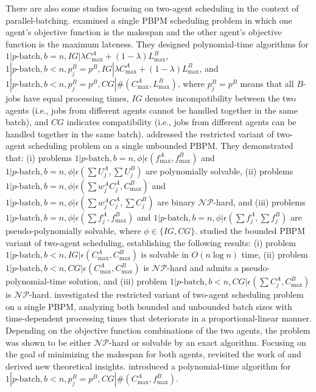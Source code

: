 \documentclass[12pt]{article}
\begin{document}
\begin{sloppypar}
There are also some studies focusing on two-agent scheduling in the context of parallel-batching. \cite{SabouniJolai2010AMM} examined a single PBPM scheduling problem in which one agent’s objective function is the makespan and the other agent's objective function is the maximum lateness.
They designed polynomial-time algorithms for $1 |p\text{-batch}, b = n, IG|\lambda C_{\max}^{A}+(1-\lambda)L_{\max}^{B}$, $1 |p\text{-batch}, b < n, p_j^B=p^B, IG|\lambda C_{\max}^{A}+(1-\lambda)L_{\max}^{B}$, and $1 |p\text{-batch}, b < n, p_j^B=p^B, CG|\#(C_{\max}^{A}, L_{\max}^{B}) $, where $p_j^B=p^B$ means that all $B$-jobs have equal processing times, $\mathit{IG}$ denotes incompatibility between the two agents (i.e., jobs from different agents cannot be handled together in the same batch), and $\mathit{CG}$ indicates compatibility (i.e., jobs from different agents can be handled together in the same batch). \cite{LiYuan2012JOS} addressed the restricted variant of two-agent scheduling problem on a single unbounded PBPM. They demonstrated that: (i) problems $1 |p\text{-batch}, b = n, \phi|\epsilon(f_{\max}^{A},f_{\max}^{B})$ and $1 |p\text{-batch}, b = n, \phi|\epsilon(\sum U_j^{A},\sum U_j^{B})$ are polynomially solvable, (ii) problems $1 |p\text{-batch}, b = n, \phi|\epsilon(\sum w_j^A C_j^{A},C_{\max}^{B})$ and $1 |p\text{-batch}, b = n, \phi|\epsilon(\sum w_j^A C_j^{A},\sum C_j^{B})$ are binary $\mathcal{NP}$-hard, and (iii) problems $1 |p\text{-batch}, b = n, \phi|\epsilon(\sum f_j^{A},f_{\max}^{B})$ and $1 |p\text{-batch}, b = n, \phi|\epsilon(\sum f_j^{A},\sum f_j^{B})$ are pseudo-polynomially solvable, where $\phi \in \{ IG, CG\}$. \cite{FanBQCheng2013JOS} studied the bounded PBPM variant of two-agent scheduling, establishing the following results: (i) problem $1 |p\text{-batch}, b < n, IG|\epsilon(C_{\max}^{A},C_{\max}^{B})$ is solvable in $O(n \log n)$ time, (ii) problem $1 |p\text{-batch}, b < n, CG|\epsilon(C_{\max}^{A},C_{\max}^{B})$ is $\mathcal{NP}$-hard and admits a pseudo-polynomial-time solution, and (iii) problem $1 |p\text{-batch}, b < n, CG|\epsilon(\sum C_j^A, C_{\max}^{B})$ is $\mathcal{NP}$-hard. \cite{TangZhaoLiu2017EJOR} investigated the restricted variant of two-agent scheduling problem on a single PBPM, analyzing both bounded and unbounded batch sizes with  time-dependent processing times that deteriorate in a proportional-linear manner. 
Depending on the objective function combinations of the two agents, the problem was shown to be either $\mathcal{NP}$-hard or solvable by an exact algorithm. Focusing on the goal of minimizing the makespan for both agents, \cite{GaoYuanNgCheng2019EJOR} revisited the work of \cite{TangZhaoLiu2017EJOR} and derived new theoretical insights. \cite{HeWuLin2022DiscreteOptimization} introduced a polynomial-time algorithm for $1 |p\text{-batch}, b < n, p_j^B=p^B, CG|\#(C_{\max}^{A},f_{\max}^{B})$.


\end{sloppypar}
\end{document}
